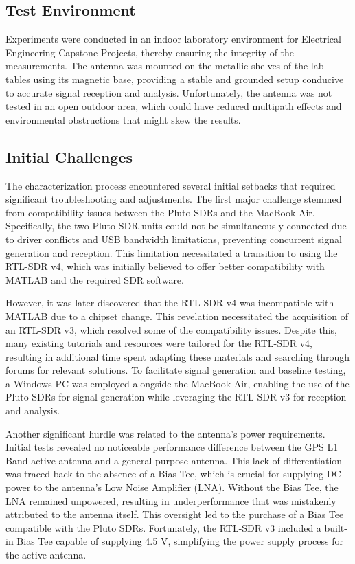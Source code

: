 \documentclass[12pt,letter]{article}
\begin{document}
\subsection*{Test Environment}

Experiments were conducted in an indoor laboratory environment for Electrical Engineering Capstone Projects, thereby ensuring the integrity of the measurements. The antenna was mounted on the metallic shelves of the lab tables using its magnetic base, providing a stable and grounded setup conducive to accurate signal reception and analysis. Unfortunately, the antenna was not tested in an open outdoor area, which could have reduced multipath effects and environmental obstructions that might skew the results.

\newpage
\subsection*{Initial Challenges}

The characterization process encountered several initial setbacks that required significant troubleshooting and adjustments. The first major challenge stemmed from compatibility issues between the Pluto SDRs and the MacBook Air. Specifically, the two Pluto SDR units could not be simultaneously connected due to driver conflicts and USB bandwidth limitations, preventing concurrent signal generation and reception. This limitation necessitated a transition to using the RTL-SDR v4, which was initially believed to offer better compatibility with MATLAB and the required SDR software.

However, it was later discovered that the RTL-SDR v4 was incompatible with MATLAB due to a chipset change. This revelation necessitated the acquisition of an RTL-SDR v3, which resolved some of the compatibility issues. Despite this, many existing tutorials and resources were tailored for the RTL-SDR v4, resulting in additional time spent adapting these materials and searching through forums for relevant solutions. To facilitate signal generation and baseline testing, a Windows PC was employed alongside the MacBook Air, enabling the use of the Pluto SDRs for signal generation while leveraging the RTL-SDR v3 for reception and analysis.

Another significant hurdle was related to the antenna's power requirements. Initial tests revealed no noticeable performance difference between the GPS L1 Band active antenna and a general-purpose antenna. This lack of differentiation was traced back to the absence of a Bias Tee, which is crucial for supplying DC power to the antenna's Low Noise Amplifier (LNA). Without the Bias Tee, the LNA remained unpowered, resulting in underperformance that was mistakenly attributed to the antenna itself. This oversight led to the purchase of a Bias Tee compatible with the Pluto SDRs. Fortunately, the RTL-SDR v3 included a built-in Bias Tee capable of supplying 4.5 V, simplifying the power supply process for the active antenna.
\end{document}
